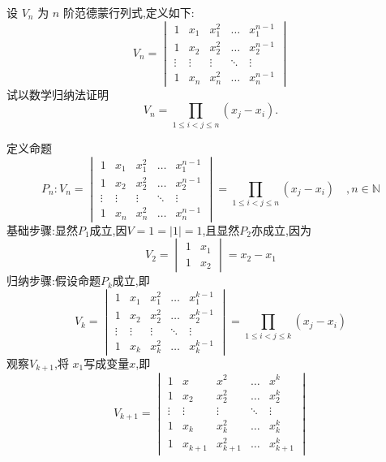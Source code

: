 \begin{questions}
    \question 设 $V_n$ 为 $n$ 阶范德蒙行列式,定义如下:
    \[
    V_n = \begin{vmatrix}
    1 & x_1 & x_1^2 & \dots & x_1^{n-1} \\
    1 & x_2 & x_2^2 & \dots & x_2^{n-1} \\
    \vdots & \vdots & \vdots & \ddots & \vdots \\
    1 & x_n & x_n^2 & \dots & x_n^{n-1}
    \end{vmatrix}
    \]
    试以数学归纳法证明
    \[
    V_n = \prod_{1 \le i < j \le n} (x_j - x_i).
    \]
    \begin{solution}
        定义命题
        \[
        P_n:V_n = 
        \begin{vmatrix}
        1 & x_1 & x_1^2 & \dots & x_1^{n-1} \\
        1 & x_2 & x_2^2 & \dots & x_2^{n-1} \\
        \vdots & \vdots & \vdots & \ddots & \vdots \\
        1 & x_n & x_n^2 & \dots & x_n^{n-1}
        \end{vmatrix}= \prod_{1 \le i < j \le n} (x_j - x_i)\quad,n \in \mathbb{N}
        \]
        基础步骤:显然$P_1$成立,因$V=1=|1|=1$,且显然$P_2$亦成立,因为
        \[
        V_2=
        \begin{vmatrix} 
        1 & x_1 \\
        1 & x_2 
        \end{vmatrix} 
        =x_2-x_1
        \]
        归纳步骤:假设命题$P_k$成立,即
        \[
        V_k = 
        \begin{vmatrix}
        1 & x_1 & x_1^2 & \dots & x_1^{k-1} \\
        1 & x_2 & x_2^2 & \dots & x_2^{k-1} \\
        \vdots & \vdots & \vdots & \ddots & \vdots \\
        1 & x_k & x_k^2 & \dots & x_k^{k-1}
        \end{vmatrix}= \prod_{1 \le i < j \le k} (x_j - x_i)
        \]
        观察$V_{k+1}$,将 $x_1$写成变量$x$,即
        \[
        V_{k+1} = \begin{vmatrix}
        1 & x & x^2 & \dots & x^{k} \\
        1 & x_2 & x_2^2 & \dots & x_2^{k} \\
        \vdots & \vdots & \vdots & \ddots & \vdots \\
        1 & x_k & x_k^2 & \dots & x_k^{k} \\
        1 & x_{k+1} & x_{k+1}^2 & \dots & x_{k+1}^{k}
        \end{vmatrix}
\]
\end{solution}
\end{questions}
